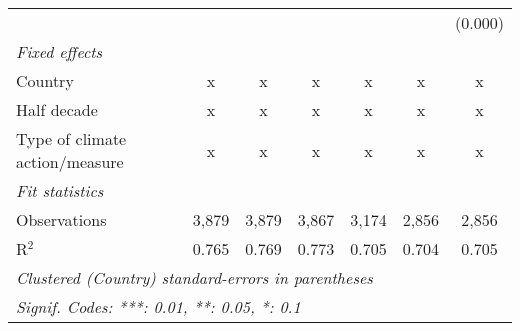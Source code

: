 \begin{tabular}{lcccccc}
                                                       &              &             &              &                &                & (0.000)\\   
   \emph{Fixed effects}\\
   Country                                             & x            & x           & x            & x              & x              & x\\  
   Half decade                                         & x            & x           & x            & x              & x              & x\\  
   Type of climate action/measure                      & x            & x           & x            & x              & x              & x\\  
   \midrule \emph{Fit statistics}\\
   Observations                                        & 3,879        & 3,879       & 3,867        & 3,174          & 2,856          & 2,856\\  
   R$^2$                                               & 0.765        & 0.769       & 0.773        & 0.705          & 0.704          & 0.705\\  
   \midrule
   \multicolumn{7}{l}{\emph{Clustered (Country) standard-errors in parentheses}}\\
   \multicolumn{7}{l}{\emph{Signif. Codes: ***: 0.01, **: 0.05, *: 0.1}}\\
\end{tabular}
\par\endgroup



